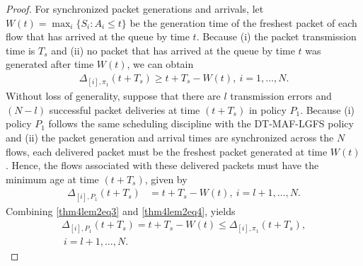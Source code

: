 \begin{proof}
For synchronized packet generations and arrivals, let $W(t) = \max_i\{S_i: A_i \leq t\}$ 
be the generation time of the freshest packet of each flow that has arrived at the queue by time $t$. Because (i) the packet transmission time is $T_s$ and (ii) no packet that has arrived at the queue by time $t$ was generated after time $W(t)$, we can obtain
\begin{align}%
\Delta_{[i],\pi_1}(t+T_s)\geq t + T_s -W(t),~i=1,\ldots,N.\label{thm4lem2eq3}
\end{align} 
Without loss of generality, suppose that there are $l$ transmission errors and $(N-l)$ successful packet deliveries at time $(t+T_s)$ in policy $P_1$. 
Because (i) policy $P_1$ follows the same scheduling discipline with the DT-MAF-LGFS policy and (ii) the packet generation and arrival times are {synchronized} across the $N$ flows, each delivered packet must be the freshest packet generated at time $W(t)$. Hence, the flows associated with these delivered packets must have the minimum age at time $(t+T_s)$, given by
\begin{align}
\Delta_{[i],P_1}(t+T_s) &= t + T_s- W(t),~i=l+1,\ldots,N. \label{thm4lem2eq4}
\end{align}
Combining \eqref{thm4lem2eq3} and \eqref{thm4lem2eq4}, yields
\begin{align}
\Delta_{[i],P_1}(t+T_s) = t + T_s- W(t) \leq \Delta_{[i],\pi_1}(t+T_s),\nonumber\\ ~i=l+1,\ldots,N. \label{thm4lem2eq16}
\end{align}


\end{proof}
